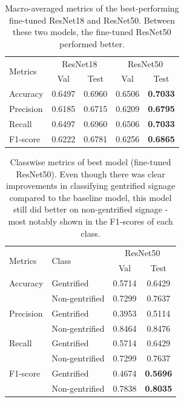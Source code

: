 {
\setlength\intextsep{10pt}
\begin{table}[h!]
    \begin{tabular}{lcccc}
    \toprule
\multirow{2}{*}{Metrics} & \multicolumn{2}{c}{ResNet18} & \multicolumn{2}{c}{ResNet50} \\ \cmidrule(lr){2-3} \cmidrule(lr){4-5}
                         & Val           & Test          & Val           & Test         \\ \hline
Accuracy                 & 0.6497        & 0.6960        & 0.6506        & \textbf{0.7033}       \\
Precision                & 0.6185        & 0.6715        & 0.6209        & \textbf{0.6795}       \\
Recall                   & 0.6497        & 0.6960        & 0.6506        & \textbf{0.7033}       \\
F1-score                 & 0.6222        & 0.6781        & 0.6256        & \textbf{0.6865}       \\ \bottomrule
    \end{tabular}
    \caption{Macro-averaged metrics of the best-performing fine-tuned ResNet18 and ResNet50. Between these two models, the fine-tuned ResNet50 performed better.}
    \label{fig:resnet_compare}
\end{table}
}

{
\setlength\intextsep{0pt}
\begin{table}[h!]
\begin{tabular}{llcc}
\toprule
\multirow{2}{*}{Metrics}   & \multirow{2}{*}{Class} & \multicolumn{2}{c}{ResNet50} \\ \cline{3-4} 
                           &                        & Val           & Test         \\ \hline
Accuracy                   & Gentrified             & 0.5714        & 0.6429       \\
                           & Non-gentrified         & 0.7299        & 0.7637       \\
Precision                  & Gentrified             & 0.3953        & 0.5114       \\
                           & Non-gentrified         & 0.8464        & 0.8476       \\
Recall                     & Gentrified             & 0.5714        & 0.6429       \\
                           & Non-gentrified         & 0.7299        & 0.7637       \\
F1-score                   & Gentrified             & 0.4674        & \textbf{0.5696}       \\
                           & Non-gentrified         & 0.7838        & \textbf{0.8035}       \\
\bottomrule
\end{tabular}
\caption{Classwise metrics of best model (fine-tuned ResNet50). Even though there was clear improvements in classifying gentrified signage compared to the baseline model, this model still did better on non-gentrified signage - most notably shown in the F1-scores of each class.}
\label{fig:resnet50_cls}
\end{table}
}

